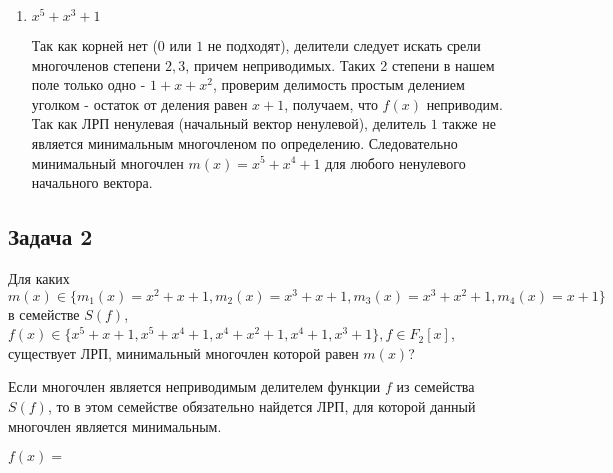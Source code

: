 \documentclass[12pt]{extarticle}
\begin{document}
\begin{enumerate}
    \item $ x^5+x^3+1$
    
    Так как корней нет ($0$ или $1$ не подходят), делители следует искать срели многочленов степени $2,3$, причем неприводимых. Таких 2 степени в нашем поле только одно - $1 + x + x^2$, проверим делимость простым делением уголком - остаток от деления равен $x+1$, получаем, что $f(x)$ неприводим. Так как ЛРП ненулевая (начальный вектор ненулевой), делитель $1$ также не является минимальным многочленом по определению. Следовательно минимальный многочлен $m(x) = x^5+x^4+1$ для любого ненулевого начального вектора.    

    
\end{enumerate}

\subsection{Задача 2}
Для каких $m(x)\in\{m_1(x)=x^2+x+1, m_2(x)=x^3+x+1, m_3(x)=x^3+x^2+1, m_4(x)=x+1\}$ в семействе $S(f)$, $f(x)\in \{x^5+x+1, x^5+x^4+1, x^4+x^2+1, x^4+1, x^3+1\}, f\in F_2[x]$, существует ЛРП, минимальный многочлен которой равен $m(x)$?

Если многочлен является неприводимым делителем функции $f$ из семейства $S(f)$, то в этом семействе обязательно найдется ЛРП, для которой данный многочлен является минимальным. 

$f(x) = $
\end{document}
